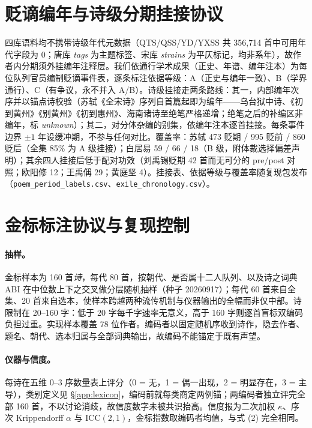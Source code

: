 \documentclass[11pt]{article}
\begin{document}
\section{贬谪编年与诗级分期挂接协议}
\label{app:chron}
四库语料均不携带诗级年代元数据（QTS/QSS/YD/YXSS 共 356{,}714 首中可用年代字段为 0；唐库 \emph{tags} 为主题标签、宋库 \emph{strains} 为平仄标记，均非系年），故作者内分期须外挂编年注释层。我们依通行学术成果（正史、年谱、编年注本）为每位队列官员编制贬谪事件表，逐条标注依据等级：A（正史与编年一致）、B（学界通行）、C（有争议，永不并入 A/B）。诗级挂接走两条路线：其一，内部编年次序并以锚点诗校验（苏轼《全宋诗》序列自首篇起即为编年——乌台狱中诗、《初到黄州》《别黄州》《初到惠州》、海南诸诗至绝笔严格递增；绝笔之后的补编区非编年，标 \emph{unknown}）；其二，对分体杂编的别集，依编年注本逐首挂接。每条事件边界 $\pm1$ 年设缓冲期，不参与任何对比。覆盖率：苏轼 473 贬期 / 995 贬前 / 860 贬后（全集 85\% 为 A 级挂接）；白居易 59 / 66 / 18（B 级，附体裁选择偏差声明）；其余四人挂接后低于配对功效（刘禹锡贬期 42 首而无可分的 pre/post 对照；欧阳修 12；王禹偁 29；黄庭坚 4）。挂接表、依据等级与覆盖率随复现包发布（\texttt{poem\_period\_labels.csv}、\texttt{exile\_chronology.csv}）。

\section{金标标注协议与复现控制}
\label{app:goldrep}

\paragraph{抽样。}
金标样本为 160 首\emph{诗}，每代 80 首，按朝代、是否属十二人队列、以及诗之词典 ABI 在中位数上下之交叉做分层随机抽样（种子 20260917）；每代 60 首来自全集、20 首来自选本，使样本跨越两种流传机制与仪器输出的全幅而非仅中部。诗限制在 20–160 字：低于 20 字每千字速率无意义，高于 160 字则逐首盲标双编码负担过重。实现样本覆盖 78 位作者。编码者以固定随机序收到诗作，隐去作者、题名、朝代、选本归属与全部词典输出，故编码不能锚定于既有声望。

\paragraph{仪器与信度。}
每诗在五维 0–3 序数量表上评分（0 = 无，1 = 偶一出现，2 = 明显存在，3 = 主导），类别定义见 \S\ref{app:lexicon}，编码前就每类商定两例锚；两编码者独立评完全部 160 首，不以讨论消歧，故信度数字未被共识抬高。信度报为二次加权 $\kappa$、序次 Krippendorff $\alpha$ 与 ICC$(2,1)$，金标指数取编码者均值，与式 (2) 完全相同。
\end{document}
